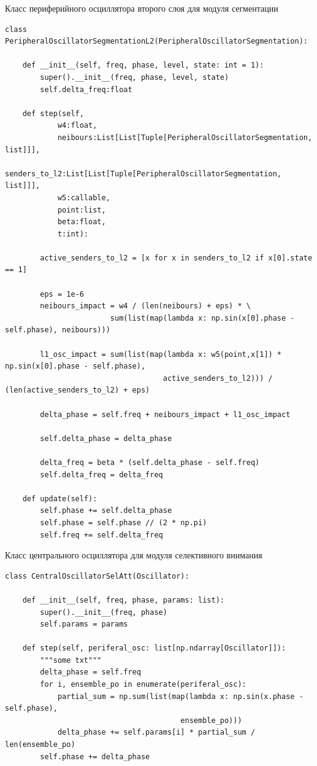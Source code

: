 \documentclass[14pt, russian]{scrartcl}
\begin{document}
\begin{listing}[H]
    \caption{Класс периферийного осциллятора второго слоя для модуля сегментации}
    \label{lst:contour_extr_sobel}
    \begin{verbatim}
class PeripheralOscillatorSegmentationL2(PeripheralOscillatorSegmentation):

    def __init__(self, freq, phase, level, state: int = 1):
        super().__init__(freq, phase, level, state)
        self.delta_freq:float

    def step(self,
            w4:float,
            neibours:List[List[Tuple[PeripheralOscillatorSegmentation, list]]],
            senders_to_l2:List[List[Tuple[PeripheralOscillatorSegmentation, list]]],
            w5:callable,
            point:list,
            beta:float,
            t:int):
        
        active_senders_to_l2 = [x for x in senders_to_l2 if x[0].state == 1]
        
        eps = 1e-6
        neibours_impact = w4 / (len(neibours) + eps) * \
                        sum(list(map(lambda x: np.sin(x[0].phase - self.phase), neibours)))
        
        l1_osc_impact = sum(list(map(lambda x: w5(point,x[1]) * np.sin(x[0].phase - self.phase),  
                                    active_senders_to_l2))) / (len(active_senders_to_l2) + eps)
        
        delta_phase = self.freq + neibours_impact + l1_osc_impact

        self.delta_phase = delta_phase

        delta_freq = beta * (self.delta_phase - self.freq)
        self.delta_freq = delta_freq

    def update(self):
        self.phase += self.delta_phase
        self.phase = self.phase // (2 * np.pi)
        self.freq += self.delta_freq
    \end{verbatim}
\end{listing}

\begin{listing}[H]
    \caption{Класс центрального осциллятора для модуля селективного внимания}
    \label{lst:contour_extr_sobel}
    \begin{verbatim}
class CentralOscillatorSelAtt(Oscillator):

    def __init__(self, freq, phase, params: list):
        super().__init__(freq, phase)
        self.params = params

    def step(self, periferal_osc: list[np.ndarray[Oscillator]]):
        """some txt"""
        delta_phase = self.freq
        for i, ensemble_po in enumerate(periferal_osc):   
            partial_sum = np.sum(list(map(lambda x: np.sin(x.phase - self.phase),
                                        ensemble_po)))
            delta_phase += self.params[i] * partial_sum / len(ensemble_po)
        self.phase += delta_phase
    \end{verbatim}
\end{listing}
\end{document}
